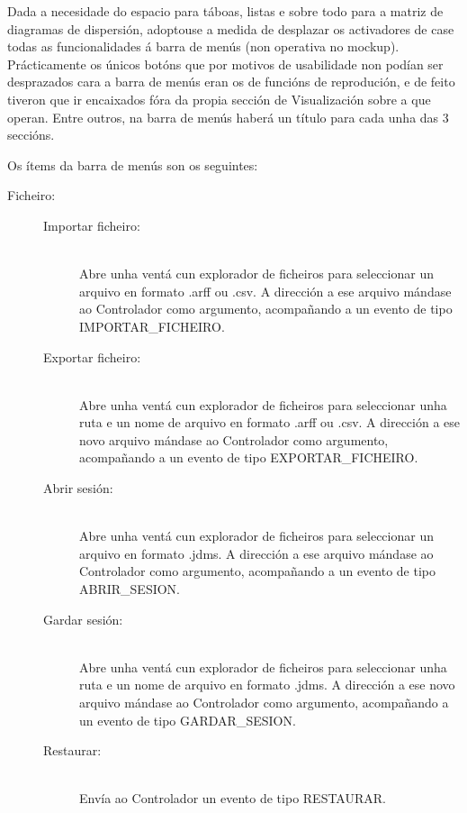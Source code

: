 Dada a necesidade do espacio para táboas, listas e sobre todo para a matriz de diagramas de dispersión, adoptouse a medida de desplazar os activadores de case todas as funcionalidades á barra de menús (non operativa no mockup). Prácticamente os únicos botóns que por motivos de usabilidade non podían ser desprazados cara a barra de menús eran os de funcións de reprodución, e de feito tiveron que ir encaixados fóra da propia sección de Visualización sobre a que operan. Entre outros, na barra de menús haberá un título para cada unha das 3 seccións.

Os ítems da barra de menús son os seguintes:

\begin{description}

\item[Ficheiro:] \hfill

\begin{description}

\item[Importar ficheiro:] \hfill \\
Abre unha ventá cun explorador de ficheiros para seleccionar un arquivo en formato .arff ou .csv. A dirección a ese arquivo mándase ao Controlador como argumento, acompañando a un evento de tipo IMPORTAR\_FICHEIRO.

\item[Exportar ficheiro:] \hfill \\
Abre unha ventá cun explorador de ficheiros para seleccionar unha ruta e un nome de arquivo en formato .arff ou .csv. A dirección a ese novo arquivo mándase ao Controlador como argumento, acompañando a un evento de tipo EXPORTAR\_FICHEIRO.

\item[Abrir sesión:] \hfill \\
Abre unha ventá cun explorador de ficheiros para seleccionar un arquivo en formato .jdms. A dirección a ese arquivo mándase ao Controlador como argumento, acompañando a un evento de tipo ABRIR\_SESION.

\item[Gardar sesión:] \hfill \\
Abre unha ventá cun explorador de ficheiros para seleccionar unha ruta e un nome de arquivo en formato .jdms. A dirección a ese novo arquivo mándase ao Controlador como argumento, acompañando a un evento de tipo GARDAR\_SESION.

\item[Restaurar:] \hfill \\
Envía ao Controlador un evento de tipo RESTAURAR.


\end{description}
\end{description}
